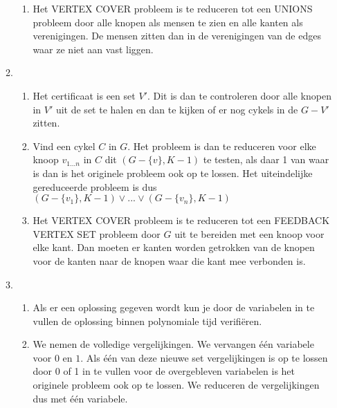 \documentclass[11pt]{article}
\begin{document}
\begin{enumerate}
\begin{enumerate}
\begin{enumerate}[a]
                    \item
                        Het VERTEX COVER probleem is te reduceren tot een UNIONS
                        probleem door alle knopen als mensen te zien en alle
                        kanten als verenigingen. De mensen zitten dan in de
                        verenigingen van de edges waar ze niet aan vast liggen.

                \end{enumerate}
            \item
                \begin{enumerate}[a]
                    \item
                        Het certificaat is een set $V'$. Dit is dan te
                        controleren door alle knopen in $V'$ uit de set te
                        halen en dan te kijken of er nog cykels in de $G - V'$
                        zitten.

                    \item
                        Vind een cykel $C$ in $G$. Het probleem is dan te
                        reduceren voor elke knoop $v_{1...n}$ in $C$ dit $(G -
                        \{v\}, K - 1)$ te testen, als daar 1 van waar is dan is
                        het originele probleem ook op te lossen. Het
                        uiteindelijke gereduceerde probleem is dus $(G -
                        \{v_1\}, K - 1) \lor ... \lor (G - \{v_n\}, K - 1)$

                    \item
                        Het VERTEX COVER probleem is te reduceren tot een
                        FEEDBACK VERTEX SET probleem door $G$ uit te bereiden
                        met een knoop voor elke kant. Dan moeten er kanten
                        worden getrokken van de knopen voor de kanten naar de
                        knopen waar die kant mee verbonden is.

                \end{enumerate}
            \item
                \begin{enumerate}[a]
                    \item
                        Als er een oplossing gegeven wordt kun je door de
                        variabelen in te vullen de oplossing binnen polynomiale
                        tijd verifi\"{e}ren.

                    \item
                        We nemen de volledige vergelijkingen. We vervangen
                        \'{e}\'{e}n variabele voor $0$ en $1$. Als één van deze
                        nieuwe set vergelijkingen is op te lossen door 0 of 1 in
                        te vullen voor de overgebleven variabelen is het
                        originele probleem ook op te lossen. We reduceren
                        de vergelijkingen dus met één variabele.


\end{enumerate}
\end{enumerate}
\end{enumerate}
\end{document}
